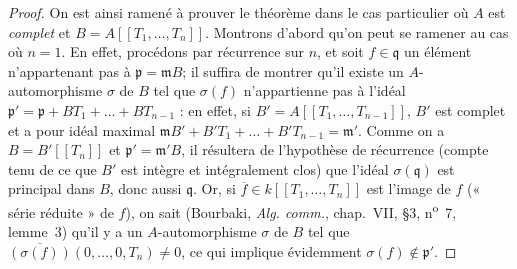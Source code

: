\begin{proof}
On est ainsi ramené à prouver le théorème dans le cas particulier où $A$ est
\emph{complet} et $B=A[[T_1,\ldots,T_n]]$. Montrons d'abord qu'on peut se ramener au
cas où $n=1$. En effet, procédons par récurrence sur $n$, et soit
$f\in\mathfrak q$ un élément n'appartenant pas à $\mathfrak p=\mathfrak mB$; il
suffira de montrer qu'il existe un $A$-automorphisme $\sigma$ de $B$ tel que
$\sigma(f)$ n'appartienne pas à l'idéal $\mathfrak p'=\mathfrak p+BT_1+\ldots+BT_{n-1}$ :
en effet, si $B'=A[[T_1,\ldots,T_{n-1}]]$, $B'$ est complet et a pour idéal maximal
$\mathfrak mB'+B'T_1+\ldots+B'T_{n-1}=\mathfrak m'$. Comme on a
$B=B'[[T_n]]$ et $\mathfrak p'=\mathfrak m'B$, il résultera de l'hypothèse de
récurrence (compte tenu de ce que $B'$ est intègre et intégralement clos) que l'idéal
$\sigma(\mathfrak q)$ est principal dans $B$, donc aussi $\mathfrak q$. Or, si
$\overline f\in k[[T_1,\ldots,T_n]]$ est l'image de $f$ (« série réduite » de $f$),
on sait (Bourbaki, \emph{Alg. comm.}, chap.~VII, \S3, n\textsuperscript{o}~7,
lemme~3) qu'il y a un $A$-automorphisme $\sigma$ de $B$ tel que
$\overline{(\sigma(f))}(0,\ldots,0,T_n)\neq0$, ce qui implique évidemment
$\sigma(f)\notin\mathfrak p'$.


\end{proof}

